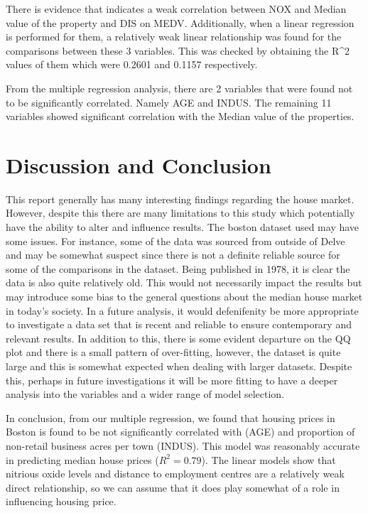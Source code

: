 \documentclass[a4paper,9pt,twocolumn,twoside,]{pinp}
\begin{document}
There is evidence that indicates a weak correlation between NOX and
Median value of the property and DIS on MEDV. Additionally, when a
linear regression is performed for them, a relatively weak linear
relationship was found for the comparisons between these 3 variables.
This was checked by obtaining the R\^{}2 values of them which were
0.2601 and 0.1157 respectively.

From the multiple regression analysis, there are 2 variables that were
found not to be significantly correlated. Namely AGE and INDUS. The
remaining 11 variables showed significant correlation with the Median
value of the properties.

\hypertarget{discussion-and-conclusion}{%
\section{Discussion and Conclusion}\label{discussion-and-conclusion}}

This report generally has many interesting findings regarding the house
market. However, despite this there are many limitations to this study
which potentially have the ability to alter and influence results. The
boston dataset used may have some issues. For instance, some of the data
was sourced from outside of Delve and may be somewhat suspect since
there is not a definite reliable source for some of the comparisons in
the dataset. Being published in 1978, it is clear the data is also quite
relatively old. This would not necessarily impact the results but may
introduce some bias to the general questions about the median house
market in today's society. In a future analysis, it would defenifenity
be more appropriate to investigate a data set that is recent and
reliable to ensure contemporary and relevant results. In addition to
this, there is some evident departure on the QQ plot and there is a
small pattern of over-fitting, however, the dataset is quite large and
this is somewhat expected when dealing with larger datasets. Despite
this, perhaps in future investigations it will be more fitting to have a
deeper analysis into the variables and a wider range of model selection.

In conclusion, from our multiple regression, we found that housing
prices in Boston is found to be not significantly correlated with (AGE)
and proportion of non-retail business acres per town (INDUS). This model
was reasonably accurate in predicting median house prices
(\(R^2 = 0.79\)). The linear models show that nitrious oxide levels and
distance to employment centres are a relatively weak direct
relationship, so we can assume that it does play somewhat of a role in
influencing housing price. \newline \newline
\end{document}
